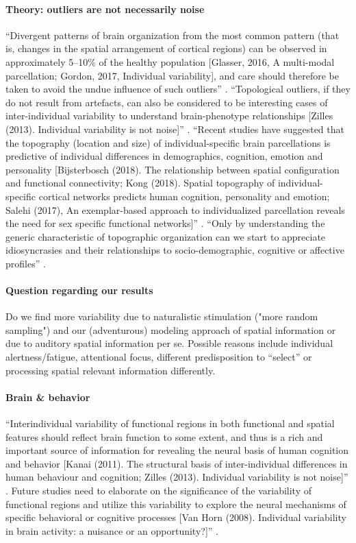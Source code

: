 \paragraph{Theory: outliers are not necessarily noise}
%
``Divergent patterns of brain organization from the most common pattern (that
is, changes in the spatial arrangement of cortical regions) can be observed in
approximately 5–10\% of the healthy population [Glasser, 2016, A multi-modal
parcellation; Gordon, 2017, Individual variability], and care should therefore
be taken to avoid the undue influence of such outliers''
\citep{eickhoff2018imaging}.
%
``Topological outliers, if they do not result from artefacts, can also be
considered to be interesting cases of inter-individual variability to understand
brain-phenotype relationships [Zilles (2013). Individual variability is not
noise]'' \citep{eickhoff2018imaging}.
%
``Recent studies have suggested that the topography (location and size) of
individual-specific brain parcellations is predictive of individual differences
in demographics, cognition, emotion and personality [Bijsterbosch (2018). The
relationship between spatial configuration and functional connectivity; Kong
(2018). Spatial topography of individual-specific cortical networks predicts
human cognition, personality and emotion; Salehi (2017), An exemplar-based
approach to individualized parcellation reveals the need for sex specific
functional networks]'' \citep{eickhoff2018imaging}.
%
``Only by understanding the generic characteristic of topographic organization
can we start to appreciate idiosyncrasies and their relationships to
socio-demographic, cognitive or affective profiles''
\citep{eickhoff2018imaging}.


\paragraph{Question regarding our results}
%
Do we find more variability due to naturalistic stimulation ("more random
sampling") and our (adventurous) modeling approach of spatial information or due
to auditory spatial information per se.
%
Possible reasons include individual alertness/fatigue, attentional focus,
different predisposition to ``select'' or processing spatial relevant
information differently.


\paragraph{Brain \& behavior}
%
``Interindividual variability of functional regions in both functional and
spatial features should reflect brain function to some extent, and thus is a
rich and important source of information for revealing the neural basis of human
cognition and behavior [Kanai (2011). The structural basis of inter-individual
differences in human behaviour and cognition; Zilles (2013). Individual
variability is not noise]'' \citep{zhen2015quantifying}.
%
Future studies need to elaborate on the significance of the variability of
functional regions and utilize this variability to explore the neural mechanisms
of specific behavioral or cognitive processes [Van Horn (2008). Individual
variability in brain activity: a nuisance or an opportunity?]''
\citep{zhen2015quantifying}.

